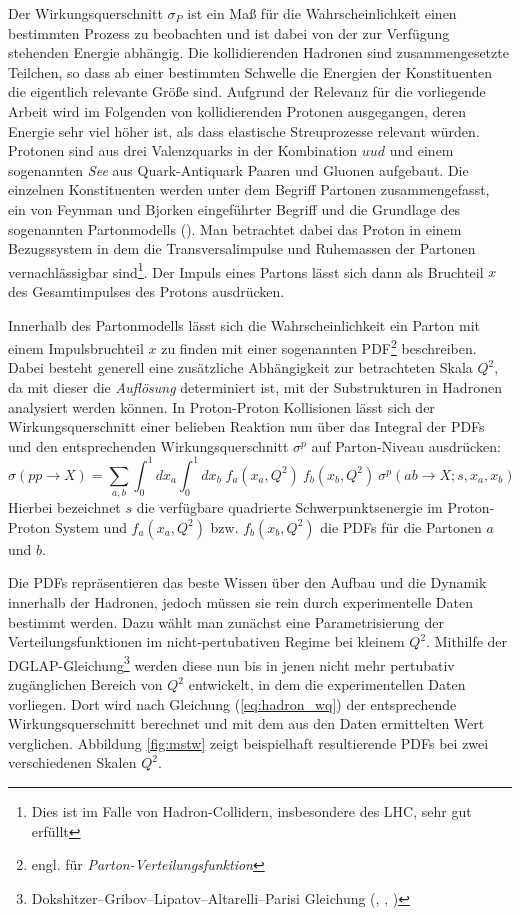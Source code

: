 Der Wirkungsquerschnitt $\sigma_P$ ist ein Maß für die Wahrscheinlichkeit einen
bestimmten Prozess zu beobachten und ist dabei von der zur Verfügung stehenden
Energie abhängig. Die kollidierenden Hadronen sind zusammengesetzte Teilchen,
so dass ab einer bestimmten Schwelle die Energien der Konstituenten die
eigentlich relevante Größe sind. Aufgrund der Relevanz für die vorliegende
Arbeit wird im Folgenden von kollidierenden Protonen ausgegangen, deren Energie
sehr viel höher ist, als dass elastische Streuprozesse relevant würden.
Protonen sind aus drei Valenzquarks in der Kombination $uud$ und einem
sogenannten \textit{See} aus Quark-Antiquark Paaren und Gluonen aufgebaut. Die
einzelnen Konstituenten werden unter dem Begriff Partonen zusammengefasst, ein
von Feynman und Bjorken eingeführter Begriff und die Grundlage des sogenannten
Partonmodells (\cite{Bjorken:1968dy}). Man betrachtet dabei das Proton in einem
Bezugssystem in dem die Transversalimpulse und Ruhemassen der Partonen
vernachlässigbar sind\footnote{Dies ist im Falle von Hadron-Collidern,
insbesondere des \ac{LHC}, sehr gut erfüllt}. Der Impuls eines Partons lässt
sich dann als Bruchteil $x$ des Gesamtimpulses des Protons ausdrücken.

Innerhalb des Partonmodells lässt sich die Wahrscheinlichkeit ein Parton mit
einem Impulsbruchteil $x$ zu finden mit einer sogenannten
\ac{PDF}\footnote{engl. für \textit{Parton-Verteilungsfunktion}} beschreiben.
Dabei besteht generell eine zusätzliche Abhängigkeit zur betrachteten Skala
$Q^2$, da mit dieser die \textit{Auflösung} determiniert ist, mit der
Substrukturen in Hadronen analysiert werden können. In Proton-Proton
Kollisionen lässt sich der Wirkungsquerschnitt einer belieben Reaktion nun über
das Integral der \ac{PDF}s und den entsprechenden Wirkungsquerschnitt
$\sigma^p$ auf Parton-Niveau ausdrücken:
\begin{equation}
    \sigma(pp\rightarrow X) = \sum_{a,b} \int_0^1 dx_a \int_0^1 dx_b \;
        f_a(x_a,Q^2) \: f_b(x_b,Q^2) \: \sigma^p(ab\rightarrow X;s,x_a,x_b)
    \label{eq:hadron_wq}
\end{equation}
Hierbei bezeichnet $s$ die verfügbare quadrierte Schwerpunktsenergie im
Proton-Proton System und $f_a(x_a,Q^2)$ bzw. $f_b(x_b,Q^2)$ die \ac{PDF}s für
die Partonen $a$ und $b$.

Die \ac{PDF}s repräsentieren das beste Wissen über den Aufbau und die Dynamik
innerhalb der Hadronen, jedoch müssen sie rein durch experimentelle Daten
bestimmt werden.
Dazu wählt man zunächst eine Parametrisierung der Verteilungsfunktionen im
nicht-pertubativen Regime bei kleinem $Q^2$. Mithilfe der
DGLAP-Gleichung\footnote{Dokshitzer–Gribov–Lipatov–Altarelli–Parisi Gleichung
(\cite{Altarelli:1977zs}, \cite{Dokshitzer:1977sg}, \cite{Gribov:1972ri})} 
werden diese nun bis in jenen nicht mehr pertubativ zugänglichen Bereich von
$Q^2$ entwickelt, in dem die experimentellen Daten vorliegen. Dort wird nach
Gleichung (\ref{eq:hadron_wq}) der entsprechende Wirkungsquerschnitt berechnet
und mit dem aus den Daten ermittelten Wert verglichen. Abbildung \ref{fig:mstw}
zeigt beispielhaft resultierende \ac{PDF}s bei zwei verschiedenen Skalen $Q^2$.

